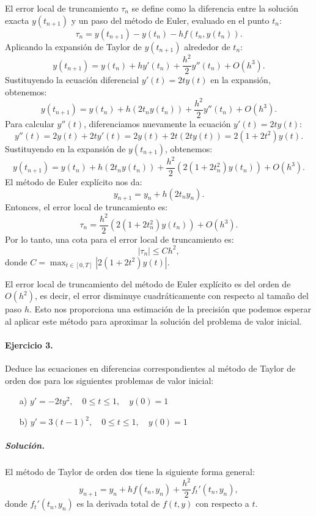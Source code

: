 \documentclass[12pt,letterpaper,oneside]{article}
\begin{document}
El error local de truncamiento \( \tau_n \) se define como la diferencia entre la solución exacta \( y(t_{n+1}) \) y un paso del método de Euler, evaluado en el punto \( t_n \):
\[
\tau_n = y(t_{n+1}) - y(t_n) - h f(t_n, y(t_n)).
\]
Aplicando la expansión de Taylor de \(y(t_{n+1})\) alrededor de \(t_n\):
\[
y(t_{n+1}) = y(t_n) + h y'(t_n) + \frac{h^2}{2} y''(t_n) + O(h^3).
\]
Sustituyendo la ecuación diferencial \(y'(t) = 2ty(t)\) en la expansión, obtenemos:
\[
y(t_{n+1}) = y(t_n) + h (2t_n y(t_n)) + \frac{h^2}{2} y''(t_n) + O(h^3).
\]
Para calcular \(y''(t)\), diferenciamos nuevamente la ecuación \(y'(t) = 2ty(t)\):
\[
y''(t) = 2y(t) + 2t y'(t) = 2y(t) + 2t (2ty(t)) = 2(1 + 2t^2) y(t).
\]
Sustituyendo en la expansión de \(y(t_{n+1})\), obtenemos:
\[
y(t_{n+1}) = y(t_n) + h (2t_n y(t_n)) + \frac{h^2}{2} (2(1 + 2t_n^2) y(t_n)) + O(h^3).
\]
El método de Euler explícito nos da:
\[
y_{n+1} = y_n + h(2t_n y_n).
\]
Entonces, el error local de truncamiento es:
\[
\tau_n = \frac{h^2}{2} (2(1 + 2t_n^2) y(t_n)) + O(h^3).
\]
Por lo tanto, una cota para el error local de truncamiento es:
\[
|\tau_n| \leq Ch^2,
\]
donde \(C = \max_{t \in [0, T]} |2(1 + 2t^2) y(t)|\).

El error local de truncamiento del método de Euler explícito es del orden de \(O(h^2)\), es decir, el error disminuye cuadráticamente con respecto al tamaño del paso \(h\). Esto nos proporciona una estimación de la precisión que podemos esperar al aplicar este método para aproximar la solución del problema de valor inicial.


\paragraph*{Ejercicio 3.} Deduce las ecuaciones en diferencias correspondientes al método de Taylor de orden dos para los siguientes problemas de valor inicial:
\begin{itemize}
    \item[a)] $y'=-2ty^2,\quad 0\leq t\leq 1,\quad y(0)=1$
    \item[b)] $y'=3(t-1)^2,\quad 0\leq t\leq 1,\quad y(0)=1$
\end{itemize}

\subparagraph*{Solución.} El método de Taylor de orden dos tiene la siguiente forma general:
\[
y_{n+1} = y_n + h f(t_n, y_n) + \frac{h^2}{2} f_t'(t_n, y_n),
\]
donde \( f_t'(t_n, y_n) \) es la derivada total de \( f(t, y) \) con respecto a \( t \).
\end{document}
